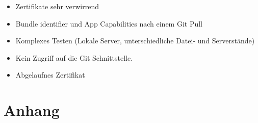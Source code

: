 \begin{itemize}
\item Zertifikate sehr verwirrend
\item Bundle identifier und App Capabilities nach einem Git Pull
\item Komplexes Testen (Lokale Server, unterschiedliche Datei- und Serverstände) 
\item Kein Zugriff auf die Git Schnittstelle.
\item Abgelaufnes Zertifikat
\end{itemize}


\newpage
\section{Anhang}
\begin{figure}[h]
\end{figure}